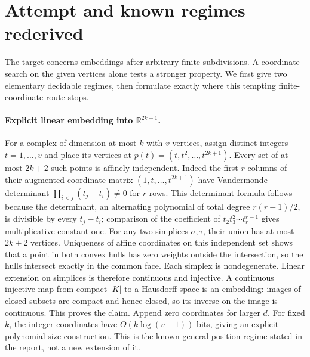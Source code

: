 \documentclass[11pt]{article}
\begin{document}
\section{Attempt and known regimes rederived}
The target concerns embeddings after arbitrary finite subdivisions. A coordinate
search on the given vertices alone tests a stronger property. We first give
two elementary decidable regimes, then formulate exactly where this tempting
finite-coordinate route stops.

\paragraph{Explicit linear embedding into $\mathbb R^{2k+1}$.}
For a complex of dimension at most $k$ with $v$ vertices, assign distinct
integers $t=1,\ldots,v$ and place its vertices at
$p(t)=(t,t^2,\ldots,t^{2k+1})$. Every set of at most $2k+2$ such points
is affinely independent. Indeed the first $r$ columns of their augmented
coordinate matrix $(1,t,\ldots,t^{2k+1})$ have Vandermonde determinant
$\prod_{i<j}(t_j-t_i)\ne0$ for $r$ rows. This determinant formula follows
because the determinant, an alternating polynomial of total degree
$r(r-1)/2$, is divisible by every $t_j-t_i$; comparison of the coefficient
of $t_2t_3^2\cdots t_r^{r-1}$ gives multiplicative constant one.
For any two simplices $\sigma,\tau$, their union has at most $2k+2$
vertices. Uniqueness of affine coordinates on this independent set shows
that a point in both convex hulls has zero weights outside the intersection,
so the hulls intersect exactly in the common face. Each simplex is nondegenerate.
Linear extension on simplices is therefore continuous and injective.
A continuous injective map from compact $|K|$ to a Hausdorff space is an
embedding: images of closed subsets are compact and hence closed, so its
inverse on the image is continuous. This proves the claim. Append zero
coordinates for larger $d$.
For fixed $k$, the integer coordinates have $O(k\log(v+1))$ bits, giving
an explicit polynomial-size construction. This is the known general-position
regime stated in the report, not a new extension of it.
\end{document}
